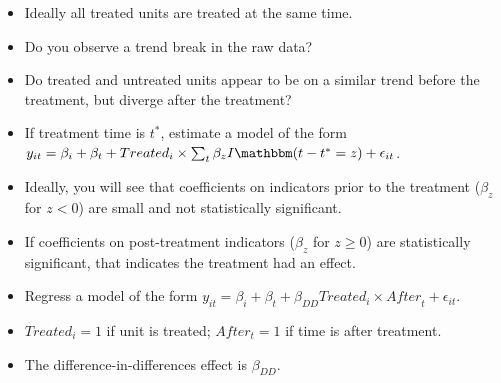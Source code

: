 \documentclass[10pt,a4paper]{protocol}
\begin{document}
\begin{itemize}
	\item Ideally all treated units are treated at the same time.
	\item Do you observe a trend break in the raw data?
	\item Do treated and untreated units appear to be on a similar trend before the treatment, but diverge after the treatment?
\end{itemize}
\divider

\begin{itemize}
	\item If treatment time is $t^*$, estimate a model of the form $y_{it}=\beta_i + \beta_t + Treated_{i} \times \sum_{\substack{t}} \beta_z  I\mathbbm(t-t^*=z)  + \epsilon_{it}$.
	\item Ideally, you will see that coefficients on indicators prior to the treatment ($\beta_z$ for $z<0$) are small and not statistically significant.
	\item If coefficients on post-treatment indicators ($\beta_z$ for $z\geq0$) are statistically significant, that indicates the treatment had an effect.
\end{itemize}
\divider

\begin{itemize}
	\item Regress a model of the form $y_{it}=\beta_i + \beta_t + \beta_{DD} \mathit{Treated}_{i} \times \mathit{After}_t + \epsilon_{it}$.
	\item $Treated_i=1$ if unit is treated; $After_t=1$ if time is after treatment.
	\item The difference-in-differences effect is $\beta_{DD}$.
\end{itemize}
\divider


\clearpage


\nocite{*}

\printbibliography


\divider


\end{document}
